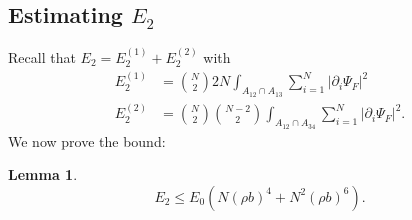 \documentclass[a4paper,11pt]{article}
\newcommand{\abs}[1]{\left\lvert #1 \right\rvert}
\newtheorem{lemma}[theorem]{Lemma}
\numberwithin{equation}{section}
\begin{document}
		\subsection{Estimating $ E_2 $}
		Recall that $ E_2=E_2^{(1)}+E_2^{(2)} $ with \begin{equation}
		\begin{aligned}
		E_2^{(1)}&=\binom{N}{2}2N\int_{A_{12}\cap A_{13}}\sum_{i=1}^{N}\abs{\partial_i\Psi_F}^2\\ E_2^{(2)}&=\binom{N}{2}\binom{N-2}{2}\int_{A_{12}\cap A_{34}}\sum_{i=1}^{N}\abs{\partial_i\Psi_F}^2.
		\end{aligned}
		\end{equation}
		We now prove the bound:
		\begin{lemma}\label{LemmaE2Bound}
			\begin{equation}
			E_2\leq E_0(N(\rho b)^4+N^2(\rho b)^6).
			\end{equation}
		\end{lemma}
\end{document}
